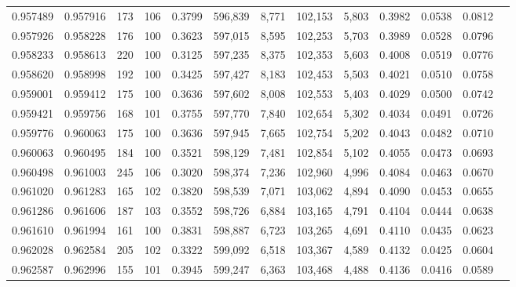\begin{tabular}{rrrrrrrrrrrrr}
0.957489 & 0.957916 &   173 & 106 &                                     0.3799 & 596,839 &   8,771 & 102,153 &   5,803 & 0.3982 & 0.0538 & 0.0812 \\
0.957926 & 0.958228 &   176 & 100 &                                     0.3623 & 597,015 &   8,595 & 102,253 &   5,703 & 0.3989 & 0.0528 & 0.0796 \\
0.958233 & 0.958613 &   220 & 100 &                                     0.3125 & 597,235 &   8,375 & 102,353 &   5,603 & 0.4008 & 0.0519 & 0.0776 \\
0.958620 & 0.958998 &   192 & 100 &                                     0.3425 & 597,427 &   8,183 & 102,453 &   5,503 & 0.4021 & 0.0510 & 0.0758 \\
0.959001 & 0.959412 &   175 & 100 &                                     0.3636 & 597,602 &   8,008 & 102,553 &   5,403 & 0.4029 & 0.0500 & 0.0742 \\
0.959421 & 0.959756 &   168 & 101 &                                     0.3755 & 597,770 &   7,840 & 102,654 &   5,302 & 0.4034 & 0.0491 & 0.0726 \\
0.959776 & 0.960063 &   175 & 100 &                                     0.3636 & 597,945 &   7,665 & 102,754 &   5,202 & 0.4043 & 0.0482 & 0.0710 \\
0.960063 & 0.960495 &   184 & 100 &                                     0.3521 & 598,129 &   7,481 & 102,854 &   5,102 & 0.4055 & 0.0473 & 0.0693 \\
0.960498 & 0.961003 &   245 & 106 &                                     0.3020 & 598,374 &   7,236 & 102,960 &   4,996 & 0.4084 & 0.0463 & 0.0670 \\
0.961020 & 0.961283 &   165 & 102 &                                     0.3820 & 598,539 &   7,071 & 103,062 &   4,894 & 0.4090 & 0.0453 & 0.0655 \\
0.961286 & 0.961606 &   187 & 103 &                                     0.3552 & 598,726 &   6,884 & 103,165 &   4,791 & 0.4104 & 0.0444 & 0.0638 \\
0.961610 & 0.961994 &   161 & 100 &                                     0.3831 & 598,887 &   6,723 & 103,265 &   4,691 & 0.4110 & 0.0435 & 0.0623 \\
0.962028 & 0.962584 &   205 & 102 &                                     0.3322 & 599,092 &   6,518 & 103,367 &   4,589 & 0.4132 & 0.0425 & 0.0604 \\
0.962587 & 0.962996 &   155 & 101 &                                     0.3945 & 599,247 &   6,363 & 103,468 &   4,488 & 0.4136 & 0.0416 & 0.0589 \\

\end{tabular}
